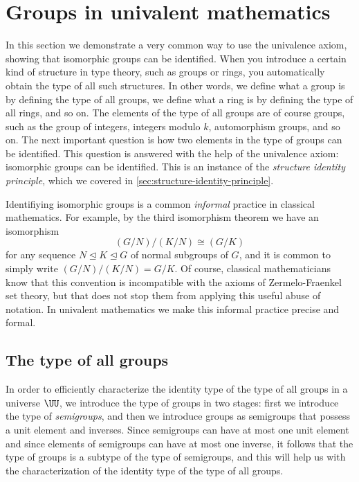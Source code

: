 \section{Groups in univalent mathematics}\label{sec:groups}

In this section we demonstrate a very common way to use the univalence axiom, showing that isomorphic groups can be identified. When you introduce a certain kind of structure in type theory, such as groups or rings, you automatically obtain the type of all such structures. In other words, we define what a group is by defining the type of all groups, we define what a ring is by defining the type of all rings, and so on. The elements of the type of all groups are of course groups, such as the group of integers, integers modulo $k$, automorphism groups, and so on. The next important question is how two elements in the type of groups can be identified. This question is answered with the help of the univalence axiom: isomorphic groups can be identified. This is an instance of the \emph{structure identity principle}, which we covered in \cref{sec:structure-identity-principle}.

Identifiying isomorphic groups is a common \emph{informal} practice in classical mathematics. For example, by the third isomorphism theorem we have an isomorphism
\begin{equation*}
  (G/N)/(K/N)\cong (G/K)
\end{equation*}
for any sequence $N \trianglelefteq K \trianglelefteq G$ of normal subgroups of $G$, and it is common to simply write $(G/N)/(K/N)=G/K$. Of course, classical mathematicians know that this convention is incompatible with the axioms of Zermelo-Fraenkel set theory, but that does not stop them from applying this useful abuse of notation. In univalent mathematics we make this informal practice precise and formal.

\subsection{The type of all groups}

In order to efficiently characterize the identity type of the type of all groups in a universe $\UU$, we introduce the type of groups in two stages: first we introduce the type of \emph{semigroups}, and then we introduce groups as semigroups that possess a unit element and inverses. Since semigroups can have at most one unit element and since elements of semigroups can have at most one inverse, it follows that the type of groups is a subtype of the type of semigroups, and this will help us with the characterization of the identity type of the type of all groups.

